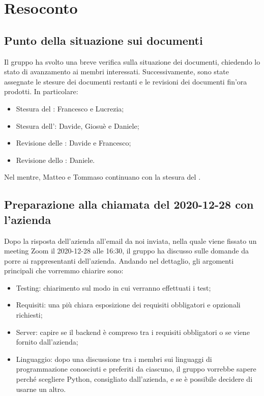 \section{Resoconto}

\subsection{Punto della situazione sui documenti}

Il gruppo \gruppo{} ha svolto una breve verifica sulla situazione dei documenti, chiedendo lo stato di avanzamento ai membri interessati. Successivamente, sono state assegnate le stesure dei documenti restanti e le revisioni dei documenti fin'ora prodotti. In particolare:
\begin{itemize}
\item Stesura del \PdQ{}: Francesco e Lucrezia;
\item Stesura dell'\AdR{}: Davide, Giosuè e Daniele;
\item Revisione delle \NdP{}: Davide e Francesco;
\item Revisione dello \SdF{}: Daniele.
\end{itemize}
Nel mentre, Matteo e Tommaso continuano con la stesura del \PdP{}.


\subsection{Preparazione alla chiamata del 2020-12-28 con l'azienda}

Dopo la risposta dell'azienda all'email da noi inviata, nella quale viene fissato un meeting Zoom il 2020-12-28 alle 16:30, il gruppo ha discusso sulle domande da porre ai rappresentanti dell'azienda. Andando nel dettaglio, gli argomenti principali che vorremmo chiarire sono:
\begin{itemize}

\item Testing: chiarimento sul modo in cui verranno effettuati i test;

\item Requisiti: una più chiara esposizione dei requisiti obbligatori e opzionali richiesti;

\item Server: capire se il backend è compreso tra i requisiti obbligatori o se viene fornito dall'azienda;

\item Linguaggio: dopo una discussione tra i membri sui linguaggi di programmazione conosciuti e preferiti da ciascuno, il gruppo vorrebbe sapere perché scegliere Python, consigliato dall'azienda, e se è possibile decidere di usarne un altro.

\end{itemize}


